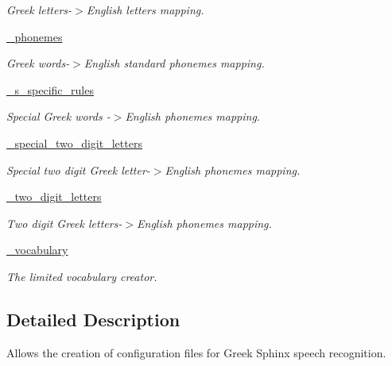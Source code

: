 \begin{DoxyCompactItemize}
\begin{DoxyCompactList}\small\item\em Greek letters-\/$>$English letters mapping. \end{DoxyCompactList}\item 
\hyperlink{classrapp__speech__detection__sphinx4_1_1greek__support_1_1GreekSupport_ac660aeb52c669c9e0bd81d9cac50c3d6}{\-\_\-phonemes}
\begin{DoxyCompactList}\small\item\em Greek words-\/$>$English standard phonemes mapping. \end{DoxyCompactList}\item 
\hyperlink{classrapp__speech__detection__sphinx4_1_1greek__support_1_1GreekSupport_acdc908eced1c5243b5f8cb75dae0cd8b}{\-\_\-s\-\_\-specific\-\_\-rules}
\begin{DoxyCompactList}\small\item\em Special Greek words -\/$>$English phonemes mapping. \end{DoxyCompactList}\item 
\hyperlink{classrapp__speech__detection__sphinx4_1_1greek__support_1_1GreekSupport_a556cca34cd5c3e51561b77a4ebcf7510}{\-\_\-special\-\_\-two\-\_\-digit\-\_\-letters}
\begin{DoxyCompactList}\small\item\em Special two digit Greek letter-\/$>$English phonemes mapping. \end{DoxyCompactList}\item 
\hyperlink{classrapp__speech__detection__sphinx4_1_1greek__support_1_1GreekSupport_a86a67ca628328d247fd54cefe02c4962}{\-\_\-two\-\_\-digit\-\_\-letters}
\begin{DoxyCompactList}\small\item\em Two digit Greek letters-\/$>$English phonemes mapping. \end{DoxyCompactList}\item 
\hyperlink{classrapp__speech__detection__sphinx4_1_1greek__support_1_1GreekSupport_a8b56f58264cda651c142f84e1aff9d58}{\-\_\-vocabulary}
\begin{DoxyCompactList}\small\item\em The limited vocabulary creator. \end{DoxyCompactList}\end{DoxyCompactItemize}


\subsection{Detailed Description}
Allows the creation of configuration files for Greek Sphinx speech recognition. 

